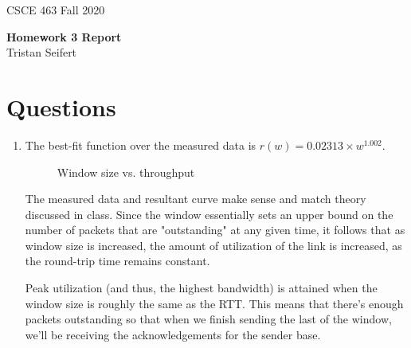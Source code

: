 \documentclass[11pt]{article}
\begin{document}
\newcommand{\answer}[1]{\mbox{~}}

{
\large  CSCE 463 \hfill Fall 2020\\
\vspace{-1.15cm}
 \begin{center}
   \textbf{Homework 3 Report} \\
   Tristan Seifert \\
    \end{center}
}

\section{Questions}

\begin{enumerate}

\item {
The best-fit function over the measured data is $r(w) = 0.02313 \times w^{1.002}$.

\begin{figure}[H]
   \centering
{}

   \caption{Window size vs. throughput}
   \label{fig:rate-window}
\end{figure}

The measured data and resultant curve make sense and match theory discussed in class. Since the window essentially sets an upper bound on the number of packets that are "outstanding" at any given time, it follows that as window size is increased, the amount of utilization of the link is increased, as the round-trip time remains constant.

Peak utilization (and thus, the highest bandwidth) is attained when the window size is roughly the same as the RTT. This means that there's enough packets outstanding so that when we finish sending the last of the window, we'll be receiving the acknowledgements for the sender base.
}


\end{enumerate}
\end{document}
